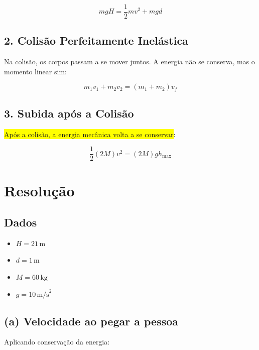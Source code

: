 \documentclass[a4paper,12pt]{article}
\begin{document}
\begin{equation}
mgH = \frac{1}{2}mv^2 + mgd
\end{equation}

\subsection*{2. Colisão Perfeitamente Inelástica}

Na colisão, os corpos passam a se mover juntos. \colorbox{orange!60}{A energia não se conserva}, mas o momento linear sim:

\begin{equation}
m_1 v_1 + m_2 v_2 = (m_1 + m_2)v_f
\end{equation}

\subsection*{3. Subida após a Colisão}

\colorbox{yellow}{Após a colisão, a energia mecânica volta a se conservar}:

\begin{equation}
\frac{1}{2}(2M)v^2 = (2M)g h_{\max}
\end{equation}

\vspace{0.5cm}

\section*{Resolução}

\subsection*{Dados}

\begin{itemize}
\item $H = 21 \, \text{m}$
\item $d = 1 \, \text{m}$
\item $M = 60 \, \text{kg}$
\item $g = 10 \, \text{m/s}^2$
\end{itemize}

\subsection*{(a) Velocidade ao pegar a pessoa}

Aplicando conservação da energia:
\end{document}
